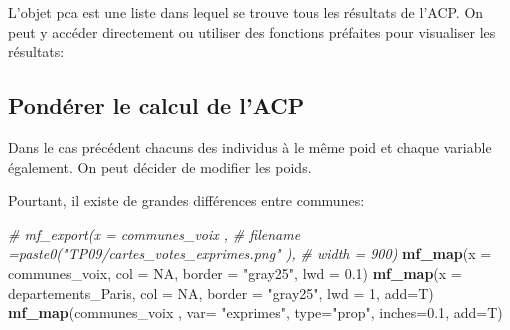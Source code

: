 \documentclass[
]{book}
\newenvironment{Shaded}{\begin{snugshade}}{\end{snugshade}}
\newcommand{\AttributeTok}[1]{\textcolor[rgb]{0.13,0.29,0.53}{#1}}
\newcommand{\CommentTok}[1]{\textcolor[rgb]{0.56,0.35,0.01}{\textit{#1}}}
\newcommand{\ConstantTok}[1]{\textcolor[rgb]{0.56,0.35,0.01}{#1}}
\newcommand{\DecValTok}[1]{\textcolor[rgb]{0.00,0.00,0.81}{#1}}
\newcommand{\FloatTok}[1]{\textcolor[rgb]{0.00,0.00,0.81}{#1}}
\newcommand{\FunctionTok}[1]{\textcolor[rgb]{0.13,0.29,0.53}{\textbf{#1}}}
\newcommand{\NormalTok}[1]{#1}
\newcommand{\StringTok}[1]{\textcolor[rgb]{0.31,0.60,0.02}{#1}}
\begin{document}
L'objet pca est une liste dans lequel se trouve tous les résultats de l'ACP. On peut y accéder directement ou utiliser des fonctions préfaites pour visualiser les résultats:

\begin{Shaded}
\end{Shaded}

\hypertarget{ponduxe9rer-le-calcul-de-lacp}{%
\subsection{Pondérer le calcul de l'ACP}\label{ponduxe9rer-le-calcul-de-lacp}}

Dans le cas précédent chacuns des individus à le même poid et chaque variable également. On peut décider de modifier les poids.

Pourtant, il existe de grandes différences entre communes:

\begin{Shaded}
\begin{Highlighting}[]
\CommentTok{\# mf\_export(x = communes\_voix ,}
\CommentTok{\#           filename =paste0("TP09/cartes\_votes\_exprimes.png" ),}
\CommentTok{\#           width = 900)}
\FunctionTok{mf\_map}\NormalTok{(}\AttributeTok{x =}\NormalTok{ communes\_voix, }\AttributeTok{col =} \ConstantTok{NA}\NormalTok{, }\AttributeTok{border =} \StringTok{"gray25"}\NormalTok{, }\AttributeTok{lwd =} \FloatTok{0.1}\NormalTok{)}
\FunctionTok{mf\_map}\NormalTok{(}\AttributeTok{x =}\NormalTok{ departements\_Paris, }\AttributeTok{col =} \ConstantTok{NA}\NormalTok{, }\AttributeTok{border =} \StringTok{"gray25"}\NormalTok{, }\AttributeTok{lwd =} \DecValTok{1}\NormalTok{, }\AttributeTok{add=}\NormalTok{T)}
\FunctionTok{mf\_map}\NormalTok{(communes\_voix ,}
       \AttributeTok{var=} \StringTok{"exprimes"}\NormalTok{,}
       \AttributeTok{type=}\StringTok{"prop"}\NormalTok{,}
       \AttributeTok{inches=}\FloatTok{0.1}\NormalTok{,}
       \AttributeTok{add=}\NormalTok{T)}
\end{Highlighting}
\end{Shaded}
\end{document}
